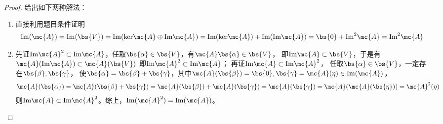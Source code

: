 \documentclass[12pt, a4paper, oneside, UTF8]{ctexbook}
\begin{document}
\begin{proof}
    给出如下两种解法：
    \begin{enumerate}[label=(\arabic*)]
        \item 直接利用题目条件证明
    \begin{align*}
        \mathrm{Im}(\mc{A})=\mathrm{Im}(\bs{V})=\mathrm{Im}(\mathrm{ker}\mc{A} \oplus  \mathrm{Im} \mc{A})=\mathrm{Im}(\mathrm{ker}\mc{A})+\mathrm{Im}(\mathrm{Im}\mc{A})
        =\bs{0}+\mathrm{Im}^2\mc{A}=\mathrm{Im}^2\mc{A}
    \end{align*}
    \item 先证$\mathrm{Im}\mc{A}^2 \subset \mathrm{Im}\mc{A}$，任取$\bs{\alpha} \in \bs{V}$，有$\mc{A}\bs{\alpha} \in \bs{V}$，
    即$\mathrm{Im}\mc{A} \subset \bs{V}$，于是有$\mc{A}(\mathrm{Im}\mc{A}) \subset \mc{A}(\bs{V})$
    即$\mathrm{Im}\mc{A}^2 \subset \mathrm{Im}\mc{A}$；
    再证$\mathrm{Im}\mc{A} \subset \mathrm{Im}\mc{A}^2$，
    任取$\bs{\alpha} \in \bs{V}$，一定存在$\bs{\beta},\bs{\gamma}$，
    使$\bs{\alpha}=\bs{\beta}+\bs{\gamma}$，其中$\mc{A}(\bs{\beta})=\bs{0},\bs{\gamma}=\mc{A}(\eta) \in \mathrm{Im}(\mc{A})$，
    \begin{align*}
        \mc{A}(\bs{\alpha})=\mc{A}(\bs{\beta}+\bs{\gamma})=
        \mc{A}(\bs{\beta})+\mc{A}(\bs{\gamma})=\mc{A}(\bs{\gamma})=\mc{A}(\mc{A}(\bs{\eta}))
        =\mc{A}^2(\eta)
    \end{align*}
    则$\mathrm{Im}\mc{A} \subset \mathrm{Im}\mc{A}^2$。综上，$\mathrm{Im}(\mc{A}^2)=\mathrm{Im}(\mc{A})$。
    
\end{enumerate}
\end{proof}
\end{document}
